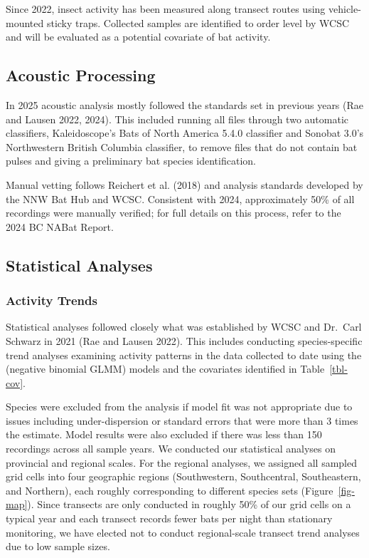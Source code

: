 \documentclass[
  letterpaper,
  DIV=11,
  numbers=noendperiod]{scrartcl}
\begin{document}
Since 2022, insect activity has been measured along transect routes
using vehicle-mounted sticky traps. Collected samples are identified to
order level by WCSC and will be evaluated as a potential covariate of
bat activity.

\subsection{Acoustic Processing}\label{acoustic-processing}

In 2025 acoustic analysis mostly followed the standards set in previous
years (Rae and Lausen 2022, 2024). This included running all files
through two automatic classifiers, Kaleidoscope's Bats of North America
5.4.0 classifier and Sonobat 3.0's Northwestern British Columbia
classifier, to remove files that do not contain bat pulses and giving a
preliminary bat species identification.

Manual vetting follows Reichert et al. (2018) and analysis standards
developed by the NNW Bat Hub and WCSC. Consistent with 2024,
approximately 50\% of all recordings were manually verified; for full
details on this process, refer to the 2024 BC NABat Report.

\subsection{Statistical Analyses}\label{statistical-analyses}

\subsubsection{Activity Trends}\label{activity-trends}

Statistical analyses followed closely what was established by WCSC and
Dr.~Carl Schwarz in 2021 (Rae and Lausen 2022). This includes conducting
species-specific trend analyses examining activity patterns in the data
collected to date using the (negative binomial GLMM) models and the
covariates identified in Table~\ref{tbl-cov}.

Species were excluded from the analysis if model fit was not appropriate
due to issues including under-dispersion or standard errors that were
more than 3 times the estimate. Model results were also excluded if
there was less than 150 recordings across all sample years. We conducted
our statistical analyses on provincial and regional scales. For the
regional analyses, we assigned all sampled grid cells into four
geographic regions (Southwestern, Southcentral, Southeastern, and
Northern), each roughly corresponding to different species sets
(Figure~\ref{fig-map}). Since transects are only conducted in roughly
50\% of our grid cells on a typical year and each transect records fewer
bats per night than stationary monitoring, we have elected not to
conduct regional-scale transect trend analyses due to low sample sizes.
\end{document}
